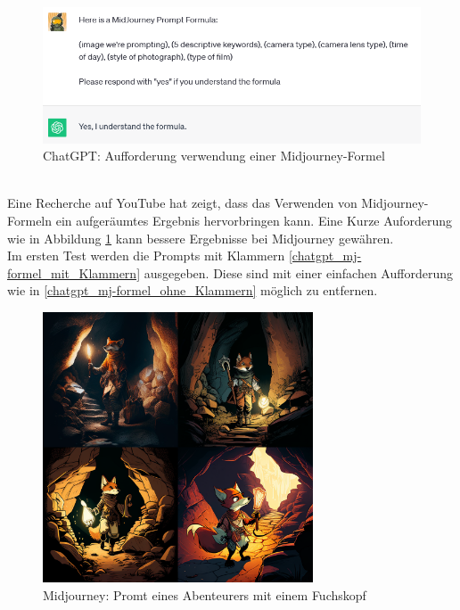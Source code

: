 \begin{figure}[h]
	\centering
	\includegraphics[width=14cm]{BilderFuerBA/04.png}
	\caption{ChatGPT: Aufforderung verwendung einer Midjourney-Formel}
	\label{chatgpt-ptompt-Midjourney-04}
\end{figure}
\\
Eine Recherche auf YouTube hat zeigt, dass das Verwenden von Midjourney-Formeln ein aufgeräumtes Ergebnis hervorbringen kann. Eine Kurze Auforderung wie in Abbildung \ref{chatgpt-ptompt-Midjourney-04} kann bessere Ergebnisse bei Midjourney gewähren.
\\
Im ersten Test werden die Prompts mit Klammern \ref{chatgpt_mj-formel_mit_Klammern} ausgegeben. Diese sind mit einer einfachen Aufforderung wie in \ref{chatgpt_mj-formel_ohne_Klammern} möglich zu entfernen.
\\
\begin{figure}
	\centering
	\includegraphics[width=8.022cm]{BilderFuerBA/fuchsKopfAbenteuerer.png}
	\caption{Midjourney: Promt eines Abenteurers mit einem Fuchskopf}
	\label{MidjourneyFuchsKopfAbenteuerer}
\end{figure}
\\
